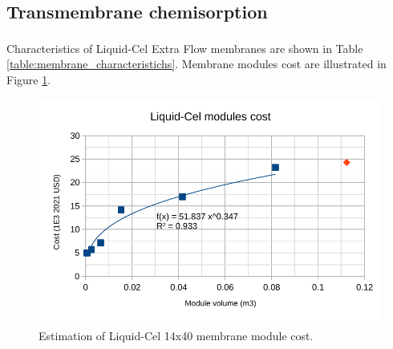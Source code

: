 \begin{refsection}[referencesApD]
\subsection{Transmembrane chemisorption}
Characteristics of Liquid-Cel\textsuperscript{\texttrademark} Extra Flow membranes are shown in Table \ref{table:membrane_characteristichs}. Membrane modules cost are illustrated in Figure \ref{fig:MembranesCostNitrogenSM}.

\begin{table}[h] 
	\centering
	\caption{Main characteristics of Liquid-Cel \textsuperscript{\texttrademark} membrane \protect\citep{rongwong2020modelin, ulbricht2013ammoni}.} \label{table:membrane_characteristichs}
\end{table}

\begin{figure}[h!]
	\centering
	\includegraphics[width=0.8\linewidth, trim={0cm 0cm 0cm 0cm},clip]{gfx/AppendixD/MembranesCost.pdf} 
	\caption{Estimation of Liquid-Cel\textsuperscript{\texttrademark} 14x40 membrane module cost.}
	\label{fig:MembranesCostNitrogenSM}
\end{figure}


\end{refsection}
